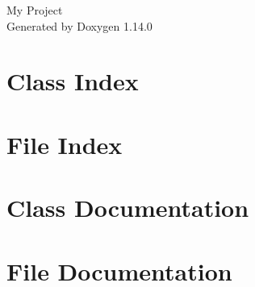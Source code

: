 \documentclass[twoside]{book}
\newcommand{\+}{\discretionary{\mbox{\scriptsize$\hookleftarrow$}}{}{}}
\newcommand{\clearemptydoublepage}{%
    \newpage{\pagestyle{empty}\cleardoublepage}%
  }
\begin{document}
  \raggedbottom
    \hypersetup{pageanchor=false,
                bookmarksnumbered=true,
                pdfencoding=unicode
               }
  \begin{titlepage}
  \vspace*{7cm}
  \begin{center}%
  {\Large My Project}\\
  \vspace*{1cm}
  {\large Generated by Doxygen 1.14.0}\\
  \end{center}
  \end{titlepage}
  \clearemptydoublepage
  \tableofcontents
  \clearemptydoublepage
  \hypersetup{pageanchor=true}
\chapter{Class Index}

\chapter{File Index}

\chapter{Class Documentation}

\chapter{File Documentation}




  \backmatter
  \newpage
  \clearemptydoublepage
  \printindex
\end{document}
